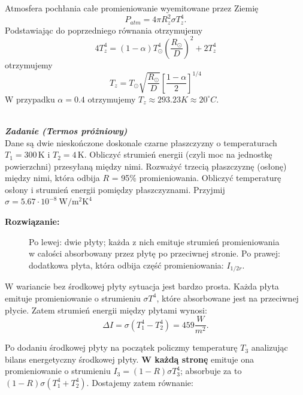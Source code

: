 \documentclass[11pt,a4paper]{article}
\newcounter{zadanie}\newcommand{\zadanie}[1][]{\addtocounter{zadanie}{1} ~\\  {\bf \emph{Zadanie \arabic{zadanie} #1 }} \\}
\begin{document}
Atmosfera pochłania całe promieniowanie wyemitowane przez  Ziemię  
$$
P_{atm} =  4\pi R_z^2 \sigma T_z^4.
$$
Podstawiając do poprzedniego równania otrzymujemy
$$
4   T_z^4 = (1-\alpha)T_\odot^4 \left(\frac{R_\odot}{D}\right)^2  
+ 2  T_z^4 
$$
otrzymujemy
$$
T_z = T_\odot \sqrt{\frac{R_\odot}{ D}} \left[\frac{1-\alpha}{2}\right]^{1/4}
$$
W przypadku $\alpha=0.4$ otrzymujemy $T_z \approx 293.23 K \approx 20^\circ C$.


\newpage

\zadanie [(Termos próżniowy)]
Dane są dwie nieskończone doskonale czarne płaszczyzny o temperaturach $T_1=300\,$K i $T_2=4$\,K.
Obliczyć strumień energii (czyli moc na jednostkę powierzchni)
przesyłaną między nimi. Rozważyć trzecią płaszczyznę (osłonę)
między nimi, która odbija $R$ = 95\% promieniowania. 
Obliczyć temperaturę osłony i strumień energii pomiędzy płaszczyznami.
Przyjmij $\sigma = 5.67\cdot 10^{-8}~\mathrm{W/m^{2}K^{4}}$

\vskip 10pt
\textbf{Rozwiązanie:}\\

\begin{figure}\vspace{-0.1cm}
  \caption{Po lewej: dwie płyty; każda z nich emituje strumień promieniowania w całości absorbowany
    przez płytę po przeciwnej stronie.
    Po prawej: dodatkowa płyta, która odbija część promieniowania: $I_{1/2r}$.}
\end{figure}

W wariancie bez środkowej płyty sytuacja jest bardzo prosta. Każda płyta emituje promieniowanie
o strumieniu $\sigma T^4$, które absorbowane jest na przeciwnej płycie. Zatem strumień energii między płytami wynosi:
\begin{equation}
\Delta I = \sigma(T_1^4-T_2^4) = 459 \frac{W}{m^2}.
\end{equation}

Po dodaniu środkowej płyty na początek policzmy temperaturę $T_3$ analizując bilans energetyczny środkowej
płyty. \textbf{W każdą stronę} emituje ona promieniowanie o strumieniu $I_3 = (1-R)\sigma T_3^4$; absorbuje
za to $(1-R)\sigma (T_1^4 +T_2^4)$.
Dostajemy zatem równanie:
\end{document}
